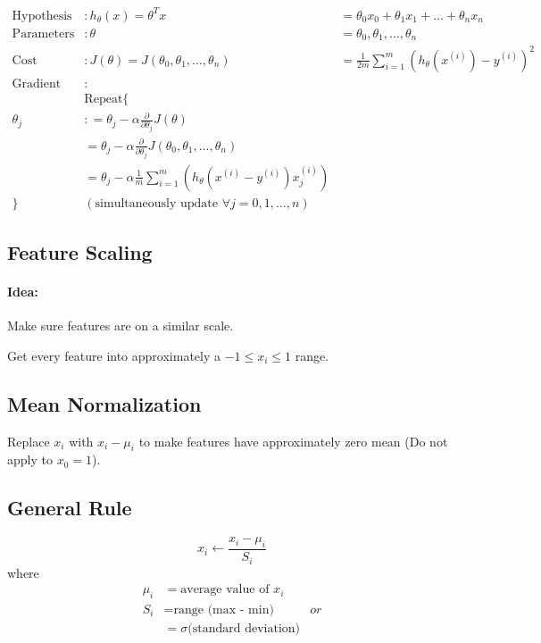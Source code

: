 \documentclass[a4paper, 12pt]{report}
\begin{document}
\begin{align*}
	\text{Hypothesis}       & :  h_\theta(x) = \theta^Tx
	                        & = \theta_0x_0 + \theta_1x_1 + \dots + \theta_nx_n              \\
	\text{Parameters}       & : \theta
	                        & =\theta_0, \theta_1, \dots, \theta_n                           \\
	\text{Cost Function}    & : J(\theta) = J(\theta_0, \theta_1, \dots, \theta_n)
	                        & =\frac{1}{2m}\sum_{i=1}^m(h_\theta(x^{(i)}) - y^{(i)})^2       \\
	\text{Gradient Descent} & :                                                              \\
	                        & \text{Repeat} \{                                               \\
	\theta_j                & : =
	\theta_j - \alpha\frac{\partial}{\partial\theta_j}J(\theta)                              \\
	                        & =
	\theta_j - \alpha\frac{\partial}{\partial\theta_j}J(\theta_0, \theta_1, \dots, \theta_n) \\
	                        & =
	\theta_j - \alpha\frac{1}{m}\sum_{i=1}^m(h_\theta(x^{(i)} - y^{(i)})x_j^{(i)})           \\
	\}                      & (\text{simultaneously update }
	\forall j = 0, 1, \dots, n)
\end{align*}

\subsection{Feature Scaling}
\paragraph{Idea:} Make sure features are on a similar scale.

Get every feature into approximately a $-1 \le x_i \le 1$ range.

\subsection{Mean Normalization}
Replace $x_i$ with $x_i - \mu_i$ to make features have approximately zero mean
(Do not apply to $x_0 = 1$).

\subsection*{General Rule}
\begin{equation*}
	x_i \leftarrow \frac{x_i - \mu_i}{S_i}
\end{equation*}
where
\begin{align*}
	\mu_i & = \text{average value of } x_i            \\
	S_i   & = \text{range (max - min)}           & or \\
	      & = \sigma \text{(standard deviation)}
\end{align*}
\end{document}
